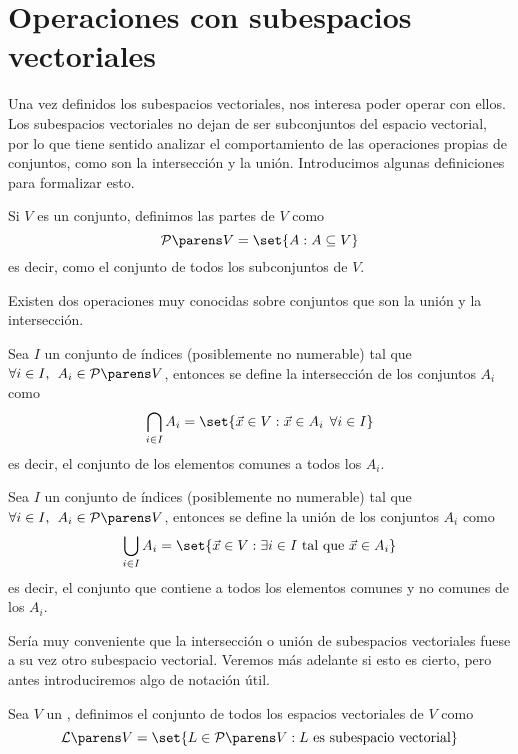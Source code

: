\documentclass[../algebra_lineal.tex]{subfiles}
\begin{document}
\section{Operaciones con subespacios vectoriales}

Una vez definidos los subespacios vectoriales, nos interesa poder operar con ellos. Los subespacios vectoriales no dejan de ser subconjuntos del espacio vectorial, por lo que tiene sentido analizar el comportamiento de las operaciones propias de conjuntos, como son la intersección y la unión. Introducimos algunas definiciones para formalizar esto.

\begin{definition}
    Si $V$ es un conjunto, definimos las partes de $V$ como
    \[
        \partesde{V} = \set{A : A \subseteq V} 
    \] 
    es decir, como el conjunto de todos los subconjuntos de $V$. 
\end{definition}

Existen dos operaciones muy conocidas sobre conjuntos que son la unión y la intersección.

\begin{definition}[Intersección]
    Sea $I$ un conjunto de índices (posiblemente no numerable) tal que $\forall i \in I, \spc A_i \in \partesde{V}$, entonces se define la intersección de los conjuntos $A_i$ como
    \[ \bigcap_{i \in I}A_i = \set{\vx \in V : \vx \in A_i \spc \forall i \in I} \]
    es decir, el conjunto de los elementos comunes a todos los $A_i$.
\end{definition}

\begin{definition}[Unión]
    Sea $I$ un conjunto de índices (posiblemente no numerable) tal que $\forall i \in I, \spc A_i \in \partesde{V}$, entonces se define la unión de los conjuntos $A_i$ como
    \[\bigcup_{i \in I}A_i = \set{\vx \in V : \exists i \in I \st \vx \in A_i}\]
    es decir, el conjunto que contiene a todos los elementos comunes y no comunes de los $A_i$.
\end{definition}

Sería muy conveniente que la intersección o unión de subespacios vectoriales fuese a su vez otro subespacio vectorial. Veremos más adelante si esto es cierto, pero antes introduciremos algo de notación útil.

\begin{definition}
    Sea $V$ un \kvspace, definimos el conjunto de todos los espacios vectoriales de $V$ como
    \[
        \subespaciosde{V} = \set{L \in \partesde{V} : L \mathrm{\, \, es \, \, subespacio \, \, vectorial }}
    \]
\end{definition}
\end{document}
